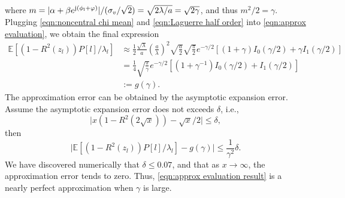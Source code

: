 \documentclass[12pt,draftclsnofoot,journal,onecolumn]{IEEEtran}
\theoremstyle{nonumberplain}
\def \j  {\rm {j}}
\begin{document}
    where $m=\lvert\alpha + \beta e^{\j (\phi_l + \varphi)}\rvert/(\sigma_v / \sqrt{2}) = \sqrt{2\lambda/a} = \sqrt{2\gamma}$, and thus $m^2/2=\gamma$. Plugging \eqref{eqn:noncentral chi mean} and \eqref{eqn:Laguerre half order} into \eqref{eqn:approx evaluation}, we obtain the final expression 
    \begin{equation}
        \begin{aligned}
        \mathbb{E}[(1-R^2(z_l))P[l]/\lambda_l] & \approx \frac{1}{2}\frac{\sqrt{\lambda}}{a}\left(\frac{a}{\lambda}\right)^2 \sqrt{\frac{a}{2}} \sqrt{\frac{\pi}{2}} e^{-\gamma/2}\left[(1+\gamma)I_0(\gamma/2)+\gamma I_1(\gamma/2)\right] \\
        & = \frac{1}{4}\sqrt{\frac{\pi}{\gamma}}e^{-\gamma/2}\left[(1+\gamma^{-1})I_0(\gamma/2)+ I_1(\gamma/2)\right] \\
        & := g(\gamma).
        \end{aligned}
        \label{eqn:approx evaluation result}
    \end{equation}
    The approximation error can be obtained by the asymptotic expansion error. Assume the asymptotic expansion error does not exceeds $\delta$, i.e.,
    \begin{equation}
        \lvert x(1-R^2(2\sqrt{x}))-\sqrt{x}/2 \rvert \leq \delta,
        \label{eqn:asymptotic error}
    \end{equation}
    then 
    \begin{equation}
        \lvert \mathbb{E}[(1-R^2(z_l))P[l]/\lambda_l] - g(\gamma)\rvert \leq \frac{1}{\gamma^2} \delta. 
    \end{equation}
    We have discovered numerically that $\delta \leq 0.07$, and that as $x\to \infty$, the approximation error tends to zero. Thus, \eqref{eqn:approx evaluation result} is a nearly perfect approximation when $\gamma$ is large.


\footnotesize
\balance 


\end{document}
